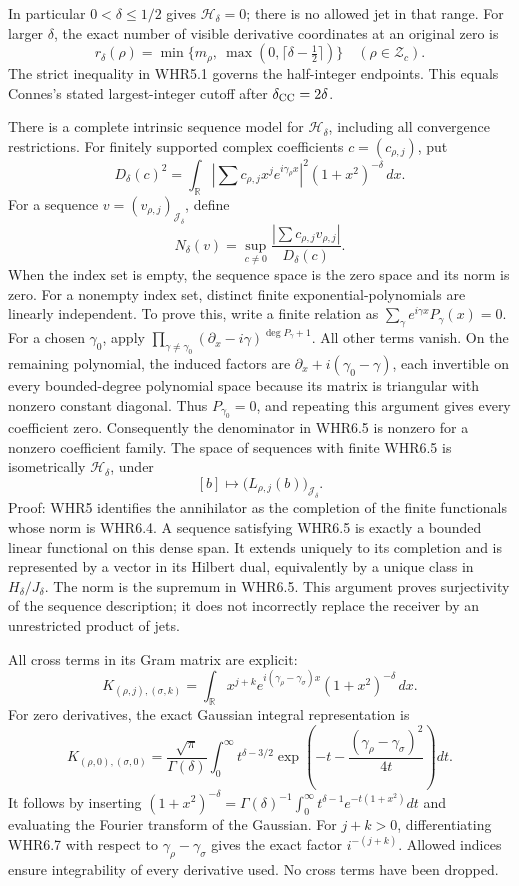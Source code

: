 In particular \(0<\delta\leq1/2\) gives \(\mathcal H_\delta=0\); there
is no allowed jet in that range. For larger \(\delta\), the exact number
of visible derivative coordinates at an original zero is \[
 r_\delta(\rho)=\min\{m_\rho,\ \max(0,\lceil\delta-\tfrac12\rceil)\}
 \quad(\rho\in\mathscr Z_c).
 \tag{WHR6.3}
\] The strict inequality in WHR5.1 governs the half-integer endpoints.
This equals Connes's stated largest-integer cutoff after
\(\delta_{\rm CC}=2\delta\).

There is a complete intrinsic sequence model for \(\mathcal H_\delta\),
including all convergence restrictions. For finitely supported complex
coefficients \(c=(c_{\rho,j})\), put \[
 D_\delta(c)^2=
 \int_{\mathbb R}\left|\sum c_{\rho,j}x^je^{i\gamma_\rho x}\right|^2
                         (1+x^2)^{-\delta}\,dx.
 \tag{WHR6.4}
\] For a sequence \(v=(v_{\rho,j})_{\mathscr J_\delta}\), define \[
 N_\delta(v)=\sup_{c\ne0}
       \frac{|\sum c_{\rho,j}v_{\rho,j}|}{D_\delta(c)}.
 \tag{WHR6.5}
\] When the index set is empty, the sequence space is the zero space and
its norm is zero. For a nonempty index set, distinct finite
exponential-polynomials are linearly independent. To prove this, write a
finite relation as \(\sum_\gamma e^{i\gamma x}P_\gamma(x)=0\). For a
chosen \(\gamma_0\), apply
\(\prod_{\gamma\ne\gamma_0}(\partial_x-i\gamma)^{\deg P_\gamma+1}\). All
other terms vanish. On the remaining polynomial, the induced factors are
\(\partial_x+i(\gamma_0-\gamma)\), each invertible on every
bounded-degree polynomial space because its matrix is triangular with
nonzero constant diagonal. Thus \(P_{\gamma_0}=0\), and repeating this
argument gives every coefficient zero. Consequently the denominator in
WHR6.5 is nonzero for a nonzero coefficient family. The space of
sequences with finite WHR6.5 is isometrically \(\mathcal H_\delta\),
under \[
 [b]\longmapsto\bigl(L_{\rho,j}(b)\bigr)_{\mathscr J_\delta}.
 \tag{WHR6.6}
\] Proof: WHR5 identifies the annihilator as the completion of the
finite functionals whose norm is WHR6.4. A sequence satisfying WHR6.5 is
exactly a bounded linear functional on this dense span. It extends
uniquely to its completion and is represented by a vector in its Hilbert
dual, equivalently by a unique class in \(H_\delta/J_\delta\). The norm
is the supremum in WHR6.5. This argument proves surjectivity of the
sequence description; it does not incorrectly replace the receiver by an
unrestricted product of jets.

All cross terms in its Gram matrix are explicit: \[
 K_{(\rho,j),(\sigma,k)}=
 \int_{\mathbb R}x^{j+k}e^{i(\gamma_\rho-\gamma_\sigma)x}
                                     (1+x^2)^{-\delta}\,dx.
 \tag{WHR6.7}
\] For zero derivatives, the exact Gaussian integral representation is
\[
 K_{(\rho,0),(\sigma,0)}=
 \frac{\sqrt\pi}{\Gamma(\delta)}
 \int_0^\infty t^{\delta-3/2}
     \exp\!\left(-t-\frac{(\gamma_\rho-\gamma_\sigma)^2}{4t}\right)dt.
 \tag{WHR6.8}
\] It follows by inserting
\((1+x^2)^{-\delta}=\Gamma(\delta)^{-1}\int_0^\infty t^{\delta-1}e^{-t(1+x^2)}dt\)
and evaluating the Fourier transform of the Gaussian. For \(j+k>0\),
differentiating WHR6.7 with respect to \(\gamma_\rho-\gamma_\sigma\)
gives the exact factor \(i^{-(j+k)}\). Allowed indices ensure
integrability of every derivative used. No cross terms have been
dropped.


